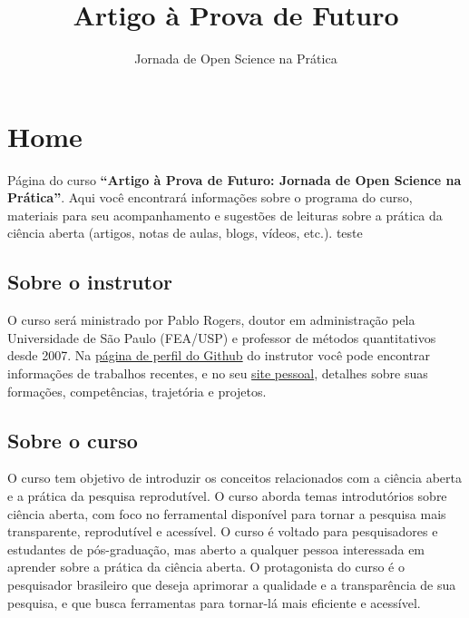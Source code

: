 \documentclass[
  a4paper,
]{article}
\title{Artigo à Prova de Futuro}
\subtitle{Jornada de Open Science na Prática}
\author{}
\date{}
\begin{document}
\maketitle


\section*{Home 🏢}\label{sec-home}


Página do curso \textbf{``Artigo à Prova de Futuro: Jornada de Open
Science na Prática''}. Aqui você encontrará informações sobre o programa
do curso, materiais para seu acompanhamento e sugestões de leituras
sobre a prática da ciência aberta (artigos, notas de aulas, blogs,
vídeos, etc.). teste

\subsection*{Sobre o instrutor}\label{sec-instrutor}


O curso será ministrado por Pablo Rogers, doutor em administração pela
Universidade de São Paulo (FEA/USP) e professor de métodos quantitativos
desde 2007. Na \href{https://github.com/phdpablo}{página de perfil do
Github} do instrutor você pode encontrar informações de trabalhos
recentes, e no seu \href{https://phdpablo.com/}{site pessoal}, detalhes
sobre suas formações, competências, trajetória e projetos.

\subsection*{Sobre o curso}\label{sec-about}


O curso tem objetivo de introduzir os conceitos relacionados com a
ciência aberta e a prática da pesquisa reprodutível. O curso aborda
temas introdutórios sobre ciência aberta, com foco no ferramental
disponível para tornar a pesquisa mais transparente, reprodutível e
acessível. O curso é voltado para pesquisadores e estudantes de
pós-graduação, mas aberto a qualquer pessoa interessada em aprender
sobre a prática da ciência aberta. O protagonista do curso é o
pesquisador brasileiro que deseja aprimorar a qualidade e a
transparência de sua pesquisa, e que busca ferramentas para tornar-lá
mais eficiente e acessível.
\end{document}
